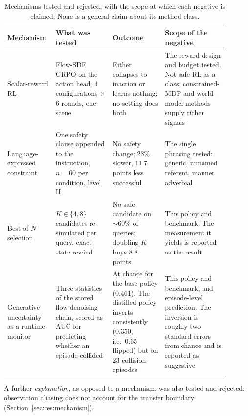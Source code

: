 \documentclass[a4paper,11pt]{report}
\begin{document}
\begin{table}[htbp]
\centering
\begin{threeparttable}
\caption[Mechanisms tested and rejected]{%
  Mechanisms tested and rejected, with the scope at which each negative is claimed. None is a
  general claim about its method class.}
\label{tab:negatives}
\footnotesize
\begin{tabular}{p{0.17\linewidth}p{0.24\linewidth}p{0.22\linewidth}p{0.27\linewidth}}
\toprule
\textbf{Mechanism} & \textbf{What was tested} & \textbf{Outcome} & \textbf{Scope of the negative} \\
\midrule
Scalar-reward RL
  & Flow-SDE GRPO on the action head, 4 configurations $\times$ 6 rounds, one scene
  & Either collapses to inaction or learns nothing; no setting does both
  & The reward design and budget tested. Not safe RL as a class; constrained-MDP and
    world-model methods supply richer signals \\
\addlinespace[3pt]
Language-expressed constraint
  & One safety clause appended to the instruction, $n=60$ per condition, level II
  & No safety change; 23\% slower, 11.7 points less successful
  & The single phrasing tested: generic, unnamed referent, manner adverbial \\
\addlinespace[3pt]
Best-of-$N$ selection
  & $K \in \{4, 8\}$ candidates re-simulated per query, exact state rewind
  & No safe candidate on $\sim$60\% of queries; doubling $K$ buys 8.8 points
  & This policy and benchmark. The measurement it yields is reported as the result \\
\addlinespace[3pt]
Generative uncertainty as a runtime monitor
  & Three statistics of the stored flow-denoising chain, scored as AUC for predicting whether an
    episode collided
  & At chance for the base policy (0.461). The distilled policy inverts consistently
    (0.350, i.e.\ 0.65 flipped) but on 23 collision episodes
  & This policy and benchmark, and episode-level prediction. The inversion is roughly two standard
    errors from chance and is reported as suggestive \\
\bottomrule
\end{tabular}
\begin{tablenotes}[flushleft]\footnotesize
\item A further \emph{explanation}, as opposed to a mechanism, was also tested and rejected:
  observation aliasing does not account for the transfer boundary
  (Section~\ref{sec:res:mechanism}).
\end{tablenotes}
\end{threeparttable}
\end{table}
\end{document}
